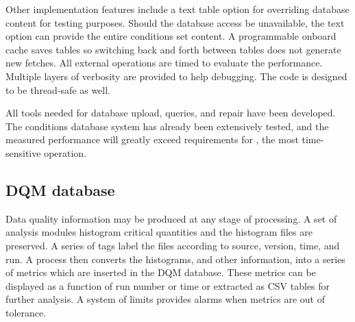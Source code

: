 Other implementation features include a text table option for overriding database content for testing purposes. Should the database access be unavailable, the text option can provide the entire conditions set content. A programmable onboard cache saves tables so switching back and forth between tables does not generate new fetches. All external operations are timed to evaluate the performance. Multiple layers of verbosity are provided to help debugging. The code is designed to be thread-safe as well.

All tools needed for database upload, queries, and repair have been developed. The conditions database system has already been extensively tested, and the measured performance will greatly exceed requirements for \passone, the most time-sensitive operation.  





\subsection{DQM database} 
Data quality information may be produced at any stage of processing.  A set of analysis modules histogram critical quantities and the histogram files are preserved.  A series of tags label the files according to source, version, time, and run. A process then converts the histograms, and other information, into a series of metrics which are inserted in the DQM database. These metrics can be displayed as a function of run number or time or extracted as CSV tables for further analysis.  A system of limits provides alarms when metrics are out of tolerance.


